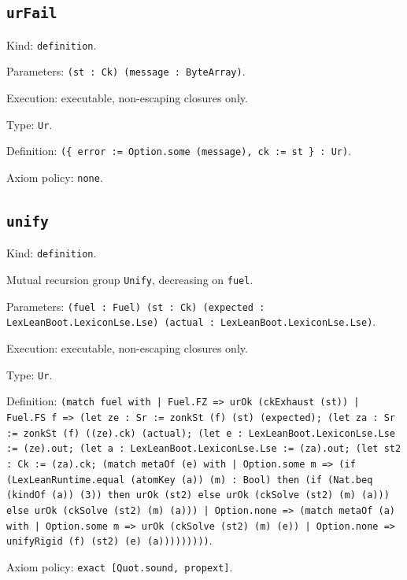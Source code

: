 \documentclass[11pt]{article}
\begin{document}
\subsection*{\texttt{urFail}}
\noindent Kind: \texttt{definition}.\par
\noindent Parameters: \texttt{(st : Ck) (message : ByteArray)}.\par
\noindent Execution: executable, non-escaping closures only.\par
\noindent Type: \texttt{Ur}.\par
\noindent Definition: \texttt{(\{ error := Option.some (message), ck := st \} : Ur)}.\par
\noindent Axiom policy: \texttt{none}.\par
\subsection*{\texttt{unify}}
\noindent Kind: \texttt{definition}.\par
\noindent Mutual recursion group \texttt{Unify}, decreasing on \texttt{fuel}.\par
\noindent Parameters: \texttt{(fuel : Fuel) (st : Ck) (expected : LexLeanBoot.LexiconLse.Lse) (actual : LexLeanBoot.LexiconLse.Lse)}.\par
\noindent Execution: executable, non-escaping closures only.\par
\noindent Type: \texttt{Ur}.\par
\noindent Definition: \texttt{(match fuel with | Fuel.FZ => urOk (ckExhaust (st)) | Fuel.FS f => (let ze : Sr := zonkSt (f) (st) (expected); (let za : Sr := zonkSt (f) ((ze).ck) (actual); (let e : LexLeanBoot.LexiconLse.Lse := (ze).out; (let a : LexLeanBoot.LexiconLse.Lse := (za).out; (let st2 : Ck := (za).ck; (match metaOf (e) with | Option.some m => (if (LexLeanRuntime.equal (atomKey (a)) (m) : Bool) then (if (Nat.beq (kindOf (a)) (3)) then urOk (st2) else urOk (ckSolve (st2) (m) (a))) else urOk (ckSolve (st2) (m) (a))) | Option.none => (match metaOf (a) with | Option.some m => urOk (ckSolve (st2) (m) (e)) | Option.none => unifyRigid (f) (st2) (e) (a)))))))))}.\par
\noindent Axiom policy: \texttt{exact [Quot.sound, propext]}.\par
\end{document}
